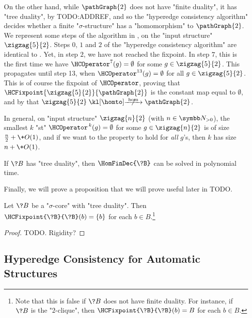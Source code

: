 \begin{example}
	\AP\label{ex:zigzag-HC-P2}
	On the other hand, while $\pathGraph{2}$ does not have "finite duality", it has
	"tree duality", by TODO:ADDREF, and so the "hyperedge consistency algorithm"
	decides whether a finite "$\sigma$-structure" has a "homomorphism" to $\pathGraph{2}$.
	We represent some steps of the algorithm in ,
	on the "input structure" $\zigzag{5}{2}$.
	Steps $0$, $1$ and $2$ of the "hyperedge consistency algorithm"
	are identical to .
	Yet, in step $2$, we have not reached the fixpoint.
	In step $7$, this is the first time
	we have $\HCOperator^{7}(g) = \emptyset$ for some
	$g\in \zigzag{5}{2}$. This propagates until step 13, 
	when $\HCOperator^{13}(g) = \emptyset$
	for all $g\in \zigzag{5}{2}$. This is of course the fixpoint of $\HCOperator$,
	proving that $\HCFixpoint{\zigzag{5}{2}}{\pathGraph{2}}$ is the constant map
	equal to $\emptyset$, and by 
	that $\zigzag{5}{2} \nothomto \pathGraph{2}$.

	In general, on "input structure" $\zigzag{n}{2}$ (with $n\in\Np$),
	the smallest $k$ "st" $\HCOperator^{\,k}(g) = \emptyset$
	for some $g \in \zigzag{n}{2}$ is of size $\frac{n}{2} + \+O(1)$,
	and if we want to the property to hold for \emph{all} $g$'s,
	then $k$ has size $n + \+O(1)$.
\end{example}

\begin{corollary}
	If $\?B$ has "tree duality", then $\HomFinDec{\?B}$ can be solved in
	polynomial time.
\end{corollary}

Finally, we will prove a proposition that we will prove useful later in TODO.
\begin{proposition}
	\AP\label{prop:HC-on-same-structure}
	Let $\?B$ be a "$\sigma$-core" with "tree duality". Then
	$\HCFixpoint{\?B}{\?B}(b) = \{b\}$ for each $b\in B$.\footnote{Note that
	this is false if $\?B$ does not have finite duality. For instance,
	if $\?B$ is the "$2$-clique", then $\HCFixpoint{\?B}{\?B}(b) = B$
	for each $b \in B$.}
\end{proposition}
\begin{proof}
	TODO. Rigidity?
\end{proof}

\subsection{\AP\label{sec:hyperedge-consistency-automatic}%
	Hyperedge Consistency for Automatic Structures}

